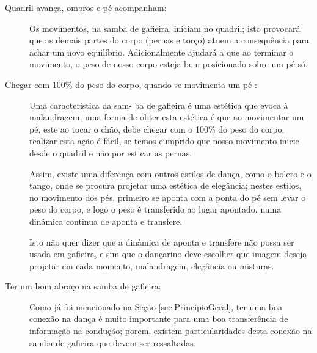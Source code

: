 \begin{description}
\item[Quadril avança, ombros e pé acompanham:]  Os movimentos, na samba de gafieira, iniciam no quadril;
isto provocará que as demais partes do corpo (pernas e torço) atuem a consequência para achar um novo equilíbrio.
Adicionalmente ajudará a que ao terminar o movimento, o peso de nosso corpo esteja bem posicionado sobre um pé só.
\item[Chegar com 100$\%$ do peso do corpo, quando se movimenta um pé :] 
Uma característica da sam- ba de gafieira é uma estética que evoca à malandragem, 
uma forma de obter esta estética é que ao movimentar um pé, este ao tocar o chão,
debe chegar com o 100\% do peso do corpo; realizar esta ação é fácil, 
se temos cumprido que nosso movimento inicie desde o quadril e não por esticar as pernas.

Assim, existe uma diferença com outros estilos de dança, 
como o bolero e o tango, 
onde se procura projetar uma estética de elegância;
nestes estilos, no movimento dos pés, primeiro se aponta com a ponta do pé sem levar o peso do corpo,
 e logo o peso é transferido ao lugar apontado, numa dinâmica continua de aponta e transfere.

Isto não quer dizer que a dinâmica de aponta e transfere não possa ser usada em gafieira,
e sim que o dançarino deve escolher que imagem deseja projetar em cada momento,
malandragem, elegância ou misturas. 

\item[Ter um bom abraço na samba de gafieira:] Como já foi mencionado na Seção \ref{sec:PrincipioGeral}, 
ter uma boa conexão na dança é muito importante para uma boa transferência de informação na condução; 
porem, existem particularidades desta conexão na samba de gafieira que devem ser ressaltadas.


\end{description}

